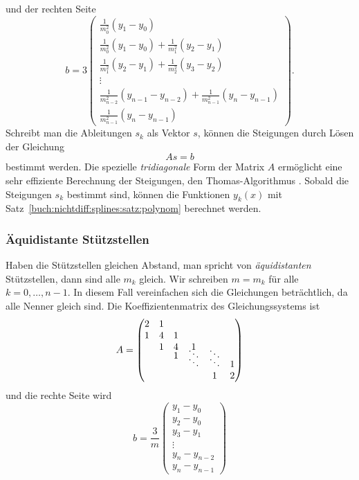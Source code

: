 und der rechten Seite
\begin{equation}
\renewcommand{\arraystretch}{1.9}
b
=
3
\begin{pmatrix}
\displaystyle
\frac{1}{m_0^2}(y_1-y_0)
\\
\displaystyle
\frac{1}{m_0^2}(y_1-y_0)
+
\frac{1}{m_1^2}(y_2-y_1)
\\
\displaystyle
\frac{1}{m_1^2}(y_2-y_1)
+
\frac{1}{m_2^2}(y_3-y_2)
\\
\vdots
\\
\displaystyle
\frac{1}{m_{n-2}^2}(y_{n-1}-y_{n-2})
+
\frac{1}{m_{n-1}^2}(y_n-y_{n-1})
\\
\displaystyle
\frac{1}{m_{n-1}^2}(y_n-y_{n-1})
\end{pmatrix}.
\label{buch:nichtdiff:splines:eqn:vektorb}
\end{equation}
Schreibt man die Ableitungen $s_k$ als Vektor $s$, können die Steigungen
durch Lösen der Gleichung
\begin{equation}
As=b
\label{buch:nichtdiff:splines:eqn:gleichungssystem}
\end{equation}
bestimmt werden.
Die spezielle {\em tridiagonale} Form der Matrix $A$
%
ermöglicht eine sehr effiziente Berechnung der Steigungen, den
Thomas-Algorithmus \cite{buch:thomas}.
%
Sobald die Steigungen $s_k$ bestimmt sind, können die Funktionen
$y_k(x)$ mit Satz~\ref{buch:nichtdiff:splines:satz:polynom}
berechnet werden.

%
%
\subsubsection{Äquidistante Stützstellen}
Haben die Stützstellen gleichen Abstand, man
spricht von {\em äquidistanten} Stützstellen, dann sind alle $m_k$ gleich.
%
Wir schreiben $m=m_k$ für alle $k=0,\dots,n-1$.
In diesem Fall vereinfachen sich die Gleichungen beträchtlich, da
alle Nenner gleich sind.
Die Koeffizientenmatrix des Gleichungssystems ist
\[
A
=
\begin{pmatrix}
2 &1 &  &              &              &  \\
1 &4 &1 &              &              &  \\
  &1 &4 &1             &              &  \\[-3pt]
  &  &1 &\smash{\ddots}&\smash{\ddots}&  \\[-3pt]
  &  &  &\smash{\ddots}&\smash{\ddots}&1 \\
  &  &  &              &1             &2
\end{pmatrix}
\]
und die rechte Seite wird
\[
b
=
\frac{3}{m}
\begin{pmatrix}
y_1-y_0\\
y_2-y_0\\
y_3-y_1\\[-3pt]
\vdots\\
y_n-y_{n-2}\\
y_n-y_{n-1}
\end{pmatrix}
\]

